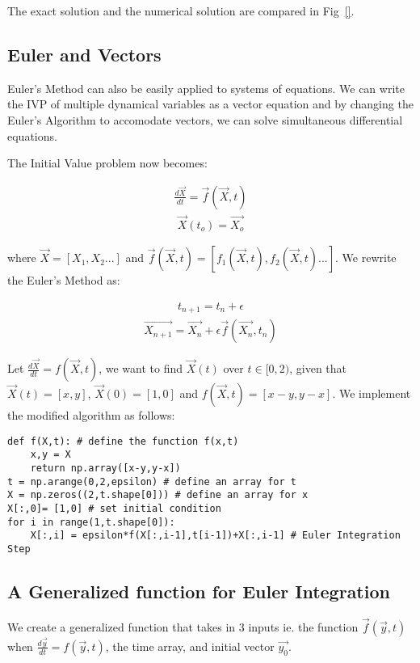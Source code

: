 \documentclass[10pt,letterpaper]{article}
\begin{document}
The exact solution and the numerical solution are compared in Fig~\ref{}.

\subsection*{Euler and Vectors}

Euler's Method can also be easily applied to systems of equations. We can write the IVP of multiple dynamical variables as a vector equation and by changing the Euler's Algorithm to accomodate vectors, we can solve simultaneous differential equations.

The Initial Value problem now becomes:

\begin{eqnarray}\frac{d\vec{X}}{dt} = \vec{f}(\vec{X}, t)\end{eqnarray}
\begin{eqnarray}\vec{X}(t_o) = \vec{X_o}\end{eqnarray}

where $\vec{X}=[X_1,X_2...]$ and $\vec{f}(\vec{X}, t)=[f_1(\vec{X}, t),f_2(\vec{X}, t)...]$. We rewrite the Euler's Method as:

\begin{eqnarray}t_{n+1} = t_n + \epsilon \end{eqnarray}
\begin{eqnarray}\vec{X_{n+1}} = \vec{X_n} + \epsilon \vec{f}(\vec{X_n}, t_n)\end{eqnarray}

Let $\frac{d\vec{X}}{dt}=f(\vec{X},t)$, we want to find $\vec{X}(t)$ over $t\in[0,2)$, given that $\vec{X}(t)=[x,y]$, $\vec{X}(0)=[1,0]$ and $f(\vec{X},t) = [x-y,y-x]$. We implement the modified algorithm as follows:

\begin{verbatim}
def f(X,t): # define the function f(x,t)
    x,y = X
    return np.array([x-y,y-x])
t = np.arange(0,2,epsilon) # define an array for t
X = np.zeros((2,t.shape[0])) # define an array for x
X[:,0]= [1,0] # set initial condition
for i in range(1,t.shape[0]):
    X[:,i] = epsilon*f(X[:,i-1],t[i-1])+X[:,i-1] # Euler Integration Step
\end{verbatim}

\subsection*{A Generalized function for Euler Integration}

We create a generalized function that takes in 3 inputs ie. the function $\vec{f}(\vec{y},t)$ when $\frac{d\vec{y}}{dt}=f(\vec{y},t)$, the time array, and initial vector $\vec{y_0}$.
\end{document}

